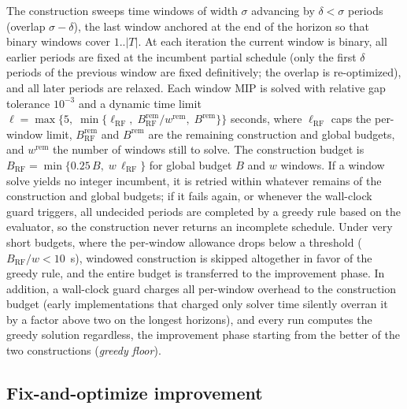 The construction sweeps time windows of width $\sigma$ advancing by
$\delta<\sigma$ periods (overlap $\sigma-\delta$), the last window
anchored at the end of the horizon so that binary windows cover
$1..|T|$. At each iteration the current window is binary, all
earlier periods are fixed at the incumbent partial schedule (only
the first $\delta$ periods of the previous window are fixed
definitively; the overlap is re-optimized), and all later periods
are relaxed. Each window MIP is solved with relative gap tolerance
$10^{-3}$ and a dynamic time limit
$\ell = \max\{5,\;\min\{\ell_{\mathrm{RF}},\;
B_{\mathrm{RF}}^{\mathrm{rem}}/w^{\mathrm{rem}},\;
B^{\mathrm{rem}}\}\}$ seconds, where $\ell_{\mathrm{RF}}$ caps the
per-window limit, $B_{\mathrm{RF}}^{\mathrm{rem}}$ and
$B^{\mathrm{rem}}$ are the remaining construction and global budgets,
and $w^{\mathrm{rem}}$ the number of windows still to solve. The
construction budget is
$B_{\mathrm{RF}}=\min\{0.25\,B,\; w\,\ell_{\mathrm{RF}}\}$ for global
budget $B$ and $w$ windows. If a window solve yields no integer
incumbent, it is retried within whatever remains of the construction
and global budgets; if it fails again, or whenever the wall-clock
guard triggers, all undecided periods
are completed by a greedy rule based on the evaluator, so the
construction never returns an incomplete schedule. Under very short
budgets, where the per-window allowance drops below a threshold
($B_{\mathrm{RF}}/w<10$~s), windowed construction is skipped
altogether in favor of the greedy rule, and the entire budget is
transferred to the improvement phase. In addition, a wall-clock guard charges all per-window overhead to
the construction budget (early implementations that charged only
solver time silently overran it by a factor above two on the longest
horizons), and every run computes the greedy solution regardless, the
improvement phase starting from the better of the two constructions
(\emph{greedy floor}).

\subsection{Fix-and-optimize improvement}
\label{sec:fo}

